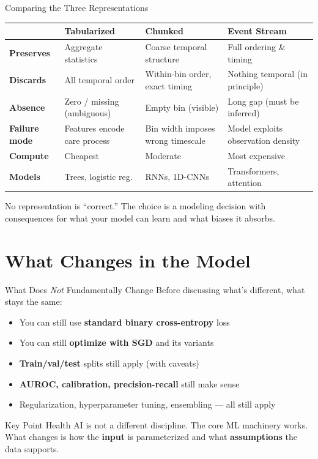 \documentclass[aspectratio=169,10pt]{beamer}
\begin{document}
\begin{frame}{Comparing the Three Representations}
\vspace{-0.3em}
{\footnotesize
\begin{center}
\begin{tabular}{lp{2.6cm}p{2.6cm}p{2.6cm}}
\toprule
& \textbf{Tabularized} & \textbf{Chunked} & \textbf{Event Stream} \\
\midrule
\textbf{Preserves} & Aggregate statistics & Coarse temporal structure & Full ordering \& timing \\
\addlinespace
\textbf{Discards} & All temporal order & Within-bin order, exact timing & Nothing temporal (in principle) \\
\addlinespace
\textbf{Absence} & Zero / missing (ambiguous) & Empty bin (visible) & Long gap (must be inferred) \\
\addlinespace
\textbf{Failure mode} & Features encode care process & Bin width imposes wrong timescale & Model exploits observation density \\
\addlinespace
\textbf{Compute} & Cheapest & Moderate & Most expensive \\
\addlinespace
\textbf{Models} & Trees, logistic reg. & RNNs, 1D-CNNs & Transformers, attention \\
\bottomrule
\end{tabular}
\end{center}
}
\vspace{0.2em}
\pause
\alert{No representation is ``correct.''} The choice is a modeling decision with consequences for what your model can learn and what biases it absorbs.
\end{frame}

\section{What Changes in the Model}

\begin{frame}{What Does \emph{Not} Fundamentally Change}
Before discussing what's different, what stays the same:
\begin{itemize}[<+->]
    \item You can still use \textbf{standard binary cross-entropy} loss
    \item You can still \textbf{optimize with SGD} and its variants
    \item \textbf{Train/val/test} splits still apply (with caveats)
    \item \textbf{AUROC, calibration, precision-recall} still make sense
    \item Regularization, hyperparameter tuning, ensembling --- all still apply
\end{itemize}
\begin{block}{Key Point}
Health AI is not a different discipline. The core ML machinery works. What changes is how the \textbf{input} is parameterized and what \textbf{assumptions} the data supports.
\end{block}
\end{frame}
\end{document}
